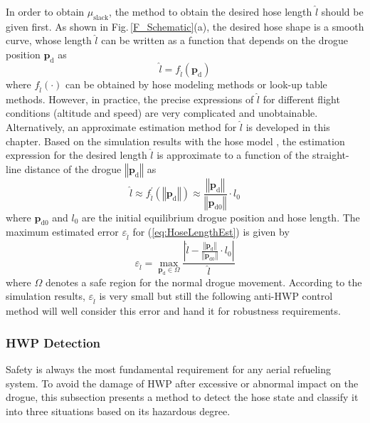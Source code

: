 In order to obtain $\mu_\text{slack}$, the method to obtain the desired
hose length $\hat{l}$ should be given first. As shown in Fig.\,\ref{F_Schematic}(a),
the desired hose shape is a smooth curve, whose length $\hat{l}$
can be written as a function that depends on the drogue position $\mathbf{p}_{\text{d}}$
as
\begin{equation}
\hat{l}=f_{\hat{l}}\left(\mathbf{p}_{\text{d}}\right)
\end{equation}
where $f_{\hat{l}}\left(\cdot\right)$ can be obtained by hose modeling
methods \cite{Ro2011,Wang2014} or look-up table methods. However,
in practice, the precise expressions of $\hat{l}$ for different flight
conditions (altitude and speed) are very complicated and unobtainable.
Alternatively, an approximate estimation method for $\hat{l}$ is
developed in this chapter. Based on the simulation results with the
hose model \cite{Ro2011,Wang2014}, the estimation expression for
the desired length $\hat{l}$ is approximate to a function of the
straight-line distance of the drogue $\left\Vert \mathbf{p}_{\text{d}}\right\Vert $
as
\begin{equation}
\hat{l}\approx f_{\hat{l}}^{\prime}\left(\left\Vert \mathbf{p}_{\text{d}}\right\Vert \right)\approx\frac{\left\Vert \mathbf{p}_{\text{d}}\right\Vert }{\left\Vert \mathbf{p}_{\text{d}0}\right\Vert }\cdot l_{0}\label{eq:HoseLengthEst}
\end{equation}
where $\mathbf{p}_{\text{d}0}$ and $l_{0}$ are the initial equilibrium
drogue position and hose length. The maximum estimated error $\varepsilon_{\hat{l}}$
for (\ref{eq:HoseLengthEst}) is given by
\begin{equation}
\varepsilon_{\hat{l}}=\max_{\mathbf{p}_{\text{d}}\in\Omega}\frac{\left|\hat{l}-\frac{\left\Vert \mathbf{p}_{\text{d}}\right\Vert }{\left\Vert \mathbf{p}_{\text{d}0}\right\Vert }\cdot l_{0}\right|}{\hat{l}}\label{eq:err}
\end{equation}
where $\Omega$ denotes a safe region for the normal drogue movement.
According to the simulation results, $\varepsilon_{\hat{l}}$ is very
small but still the following anti-HWP control method will well consider
this error and hand it for robustness requirements.

\subsubsection{HWP Detection}

Safety is always the most fundamental requirement for any aerial refueling
system. To avoid the damage of HWP after excessive or abnormal impact
on the drogue, this subsection presents a method to detect the hose
state and classify it into three situations based on its hazardous
degree.

